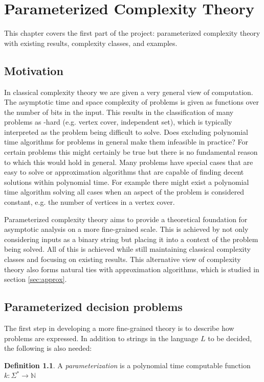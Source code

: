 \documentclass[a4paper,11pt]{report}
\theoremstyle{plain}
\theoremstyle{definition}
\newtheorem{defn}[thm]{Definition} %
\begin{document}
\chapter{Parameterized Complexity Theory}
This chapter covers the first part of the project: parameterized complexity theory with existing results, complexity classes, and examples.

\section{Motivation}
In classical complexity theory we are given a very general view of computation.
The asymptotic time and space complexity of problems is given as functions over the number of bits in the input.
This results in the classification of many problems as \NP-hard (e.g. vertex cover, independent set), which is typically interpreted as the problem being difficult to solve.
Does excluding polynomial time algorithms for problems in general make them infeasible in practice?
For certain problems this might certainly be true but there is no fundamental reason to which this would hold in general.
Many problems have special cases that are easy to solve or approximation algorithms that are capable of finding decent solutions within polynomial time.
For example there might exist a polynomial time algorithm solving all cases when an aspect of the problem is considered constant, e.g. the number of vertices in a vertex cover.

Parameterized complexity theory aims to provide a theoretical foundation for asymptotic analysis on a more fine-grained scale.
This is achieved by not only considering inputs as a binary string but placing it into a context of the problem being solved.
All of this is achieved while still maintaining classical complexity classes and focusing on existing results.
This alternative view of complexity theory also forms natural ties with approximation algorithms, which is studied in section \ref{sec:approx}.

\section{Parameterized decision problems}
The first step in developing a more fine-grained theory is to describe how problems are expressed.
In addition to strings in the language $L$ to be decided, the following is also needed:

\begin{defn}
A \emph{parameterization} is a polynomial time computable function $k : \Sigma^* \rightarrow \mathbb{N}$
\end{defn}
\end{document}
